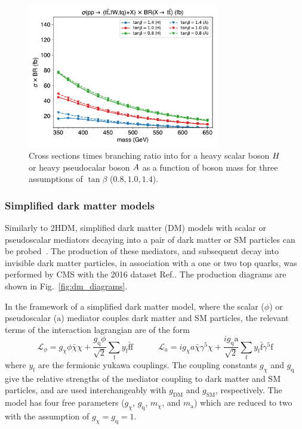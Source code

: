 \begin{figure}[htb!]
    \centering
    \includegraphics[width=0.75\textwidth]{figs/ftan/plot_1d_2hdm_xsec}
\caption{Cross sections times branching ratio into \ttbar for a heavy scalar boson $H$ 
or heavy pseudocalar boson $A$ as a function of boson mass for three assumptions of 
$\tan\beta$ ($0.8, 1.0, 1.4$).}
\label{fig:thdm_1d_xsec}
\end{figure}

\FloatBarrier

\subsubsection{Simplified dark matter models}
\label{sec:ftdm}

Similarly to 2HDM, simplified dark matter (DM) models with scalar or pseudoscalar
mediators decaying into a pair of dark matter or SM particles can be
probed~\cite{THEORY:DMsingletop}. The production of these mediators,
and subsequent decay into invisible dark matter particles,
in association with a one or two top
quarks, was performed by CMS with the 2016 dataset
Ref.\cite{CMS:DMsingletop,CMS:DMttpair}. The production diagrams are shown in
Fig.~\ref{fig:dm_diagrams}.

In the framework of a simplified dark matter model, where the scalar ($\phi$)
or pseudoscalar ($\mathrm{a}$) mediator couples dark matter and SM particles,
the relevant terms of the interaction lagrangian are of the form
\[
    \mathcal{L}_{\phi}=g_{\chi}\phi\bar{\chi}\chi + \frac{g_\mathrm{q} \phi}{\sqrt{2}} \sum_{\mathrm{f}} y_\mathrm{f} \bar{\mathrm{f}} \mathrm{f}
    \quad\quad\quad
    \mathcal{L}_{a}=i g_{\chi}a\bar{\chi}\gamma^5\chi + \frac{i g_\mathrm{q} \mathrm{a}}{\sqrt{2}} \sum_{\mathrm{f}} y_\mathrm{f} \bar{\mathrm{f}} \gamma^5 \mathrm{f}
\]
where $y_\mathrm{f}$ are the fermionic yukawa couplings. The coupling
constants $g_\chi$ and $g_\mathrm{q}$ give the relative strengths of the
mediator coupling to dark matter and SM particles, and are used
interchangeably with $g_\mathrm{DM}$ and $g_\mathrm{SM}$, respectively. The
model has four free parameters ($g_\chi$, $g_\mathrm{q}$, $m_\chi$, and
$m_\mathrm{a}$) which are reduced to two with the assumption of $g_\chi =
g_\mathrm{q} = 1$.

